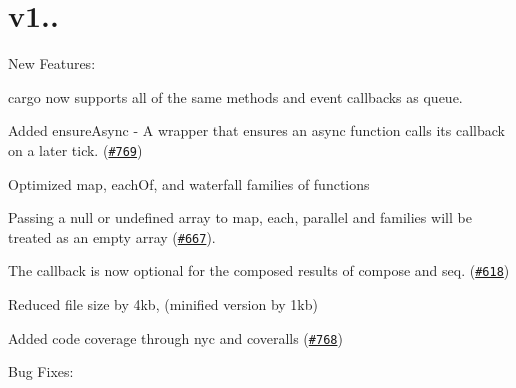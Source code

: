 \section*{v1..}

New Features\+:


\begin{DoxyItemize}
\item {\ttfamily cargo} now supports all of the same methods and event callbacks as {\ttfamily queue}.
\item Added {\ttfamily ensure\+Async} -\/ A wrapper that ensures an async function calls its callback on a later tick. (\href{https://github.com/caolan/async/issues/769}{\tt \#769})
\item Optimized {\ttfamily map}, {\ttfamily each\+Of}, and {\ttfamily waterfall} families of functions
\item Passing a {\ttfamily null} or {\ttfamily undefined} array to {\ttfamily map}, {\ttfamily each}, {\ttfamily parallel} and families will be treated as an empty array (\href{https://github.com/caolan/async/issues/667}{\tt \#667}).
\item The callback is now optional for the composed results of {\ttfamily compose} and {\ttfamily seq}. (\href{https://github.com/caolan/async/issues/618}{\tt \#618})
\item Reduced file size by 4kb, (minified version by 1kb)
\item Added code coverage through {\ttfamily nyc} and {\ttfamily coveralls} (\href{https://github.com/caolan/async/issues/768}{\tt \#768})
\end{DoxyItemize}

Bug Fixes\+:


